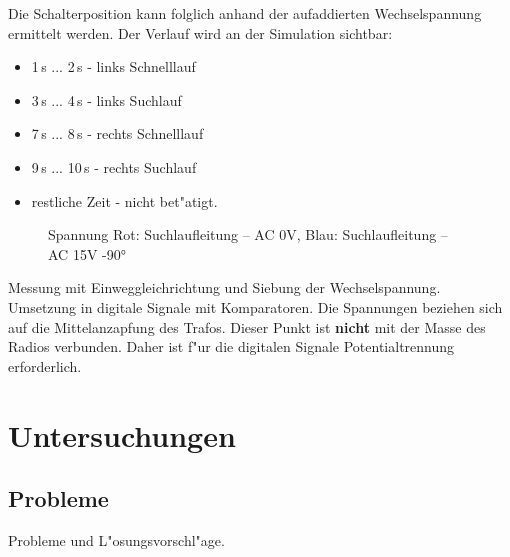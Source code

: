 \documentclass[ngerman,11pt,parskip=half] {scrartcl}
\begin{document}
Die Schalterposition kann folglich anhand der aufaddierten Wechselspannung ermittelt werden. Der Verlauf wird an der Simulation sichtbar:

\begin{itemize}
\item 1\,s ... 2\,s - links Schnelllauf
\item 3\,s ... 4\,s - links Suchlauf
\item 7\,s ... 8\,s - rechts Schnelllauf
\item 9\,s ... 10\,s - rechts Suchlauf
\item restliche Zeit - nicht bet"atigt.
\end{itemize}

\begin{figure}[H]
\centering
{}
\caption{Spannung Rot: Suchlaufleitung -- AC 0V, Blau: Suchlaufleitung -- AC 15V -90°} \label{fig:1}
\end{figure}

Messung mit Einweggleichrichtung und Siebung der Wechselspannung. Umsetzung in digitale Signale mit Komparatoren. Die Spannungen beziehen sich auf die Mittelanzapfung des Trafos. Dieser Punkt ist \textbf{nicht} mit der Masse des Radios verbunden. Daher ist f"ur die digitalen Signale Potentialtrennung erforderlich.

\section{Untersuchungen} \label{sec:untersuchung}

\subsection{Probleme} \label{sec:untersuchung:probleme}

Probleme und L"osungsvorschl"age.
\end{document}
